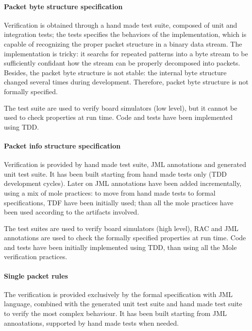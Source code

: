\documentclass{article}
\begin{document}
\paragraph*{Packet byte structure specification}

Verification is obtained through a hand made test suite, composed of unit and integration tests; the tests specifies the behaviors of the implementation, which is capable of recognizing the proper packet structure in a binary data stream. 
The implementation is tricky: it searchs for repeated patterns into a byte stream to be sufficiently confidant how the stream can be properly decomposed into packets.
Besides, the packet byte structure is not stable: the internal byte structure changed several times during development.
Therefore, packet byte structure is not formally specified.

The test suite are used to verify board simulators (low level), but it cannot be used to check properties at run time.
Code and tests have been implemented using TDD.

\paragraph*{Packet info structure specification}

Verification is provided by hand made test suite, JML annotations and generated unit test suite. 
It has been built starting from hand made tests only (TDD development cycles).
Later on JML annotations have been added incrementally, using a mix of mole practices: to move from hand made tests to formal specifications, TDF have been initially used; than all the mole practices have been used according to the artifacts involved.

The test suites are used to verify board simulators (high level), RAC and JML annotations are used to check the formally specified properties at run time.
Code and tests have been initially implemented using TDD, than using all the Mole verification practices.

\paragraph*{Single packet rules}

The verification is provided exclusively by the formal specification with JML language, combined with the generated unit test suite and hand made test suite to verify the most complex behaviour.
It has been built starting from JML annoatations, supported by hand made tests when needed.
\end{document}

